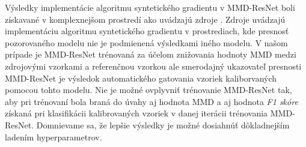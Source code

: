 Výsledky implementácie algoritmu syntetického gradientu v MMD-ResNet boli získavané v komplexnejšom prostredí ako uvádzajú zdroje \cite{Jaderberg2016, Czarnecki2017}. Zdroje uvádzajú implementáciu algoritmu syntetického gradientu v prostrediach, kde presnosť pozorovaného modelu nie je podmienená výsledkami iného modelu. V našom prípade je MMD-ResNet trénovaná za účelom znižovania hodnoty MMD medzi zdrojovými vzorkami a referenčnou vzorkou ale smerodajný ukazovateľ presnosti MMD-ResNet je výsledok automatického gatovania vzoriek kaliborvaných pomocou tohto modelu. Nie je možné ovplyvniť trénovanie MMD-ResNet tak, aby pri trénovaní bola braná do úvahy aj hodnota MMD a aj hodnota \textit{F1 skóre} získaná pri klasifikácii kalibrovaných vzoriek v danej iterácii trénovania MMD-ResNet. Domnievame sa, že lepšie výsledky je možné dosiahnúť dôkladnejším ladením hyperparametrov.